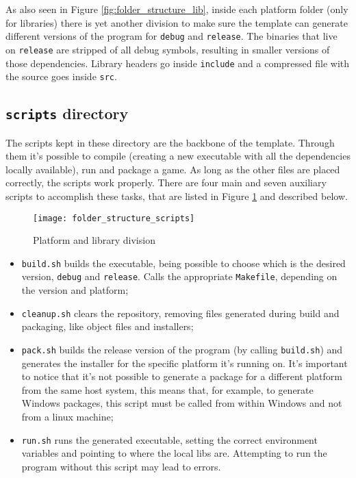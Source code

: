 As also seen in Figure \ref{fig:folder_structure_lib}, inside each platform folder (only for libraries) there is yet another division to make sure the template can generate different versions of the program for \texttt{debug} and \texttt{release}. The binaries that live on \texttt{release} are stripped of all debug symbols, resulting in smaller versions of those dependencies. Library headers go inside \texttt{include} and a compressed file with the source goes inside \texttt{src}.


\subsection{\texttt{scripts} directory}

The scripts kept in these directory are the backbone of the template. Through them it's possible to compile (creating a new executable with all the dependencies locally available), run and package a game. As long as the other files are placed correctly, the scripts work properly. There are four main and seven auxiliary scripts to accomplish these tasks, that are listed in Figure \ref{fig:folder_structure_scripts} and described below.

\begin{figure}[h!]
\centering
\texttt{[image: folder\_structure\_scripts]}
\caption{Platform and library division}
\label{fig:folder_structure_scripts}
\end{figure}

\begin{itemize}
	\item \texttt{build.sh} builds the executable, being possible to choose which is the desired version, \texttt{debug} and \texttt{release}. Calls the appropriate \texttt{Makefile}, depending on the version and platform;
	\item \texttt{cleanup.sh} clears the repository, removing files generated during build and packaging, like object files and installers;
	\item \texttt{pack.sh} builds the release version of the program (by calling \texttt{build.sh}) and generates the installer for the specific platform it's running on. It's important to notice that it's not possible to generate a package for a different platform from the same host system, this means that, for example, to generate Windows packages, this script must be called from within Windows and not from a linux machine;
	\item \texttt{run.sh} runs the generated executable, setting the correct environment variables and pointing to where the local libs are. Attempting to run the program without this script may lead to errors.
\end{itemize}


